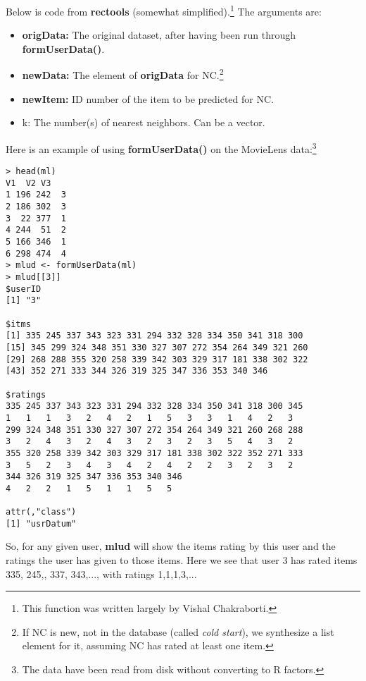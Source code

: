 Below is code from \textbf{rectools} (somewhat
simplified).\footnote{This function was written largely by Vishal
Chakraborti.} The arguments are:

\begin{itemize}

\item \textbf{origData:}  The original dataset, after having been run through
\textbf{formUserData()}. 

\item \textbf{newData:}  The element of \textbf{origData} for NC.\footnote{If
NC is new, not in the database (called \textit{cold start}), we
synthesize a list element for it, assuming NC has rated at least one
item.}

\item \textbf{newItem:}  ID number of the item to be predicted for NC.

\item k:  The number(s) of nearest neighbors.  Can be a vector.

\end{itemize} 

Here is an example of using \textbf{formUserData()} on the MovieLens
data:\footnote{The data have been read from disk without converting to R
factors.}

\begin{lstlisting}
> head(ml)
V1  V2 V3
1 196 242  3
2 186 302  3
3  22 377  1
4 244  51  2
5 166 346  1
6 298 474  4
> mlud <- formUserData(ml)
> mlud[[3]]
$userID
[1] "3"

$itms
[1] 335 245 337 343 323 331 294 332 328 334 350 341 318 300
[15] 345 299 324 348 351 330 327 307 272 354 264 349 321 260
[29] 268 288 355 320 258 339 342 303 329 317 181 338 302 322
[43] 352 271 333 344 326 319 325 347 336 353 340 346

$ratings
335 245 337 343 323 331 294 332 328 334 350 341 318 300 345 
1   1   1   3   2   4   2   1   5   3   3   1   4   2   3 
299 324 348 351 330 327 307 272 354 264 349 321 260 268 288 
3   2   4   3   2   4   3   2   3   2   3   5   4   3   2 
355 320 258 339 342 303 329 317 181 338 302 322 352 271 333 
3   5   2   3   4   3   4   2   4   2   2   3   2   3   2 
344 326 319 325 347 336 353 340 346 
4   2   2   1   5   1   1   5   5 

attr(,"class")
[1] "usrDatum"
\end{lstlisting}

So, for any given user, \textbf{mlud} will show the items rating by this
user and the ratings the user has given to those items.  Here we see
that user 3 has rated items 335, 245,, 337, 343,..., with ratings 1,1,1,3,...

